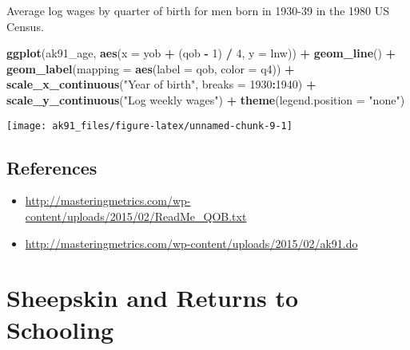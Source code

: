 \documentclass[]{book}
\newenvironment{Shaded}{\begin{snugshade}}{\end{snugshade}}
\newcommand{\KeywordTok}[1]{\textcolor[rgb]{0.13,0.29,0.53}{\textbf{#1}}}
\newcommand{\DataTypeTok}[1]{\textcolor[rgb]{0.13,0.29,0.53}{#1}}
\newcommand{\DecValTok}[1]{\textcolor[rgb]{0.00,0.00,0.81}{#1}}
\newcommand{\StringTok}[1]{\textcolor[rgb]{0.31,0.60,0.02}{#1}}
\newcommand{\OperatorTok}[1]{\textcolor[rgb]{0.81,0.36,0.00}{\textbf{#1}}}
\newcommand{\NormalTok}[1]{#1}
\providecommand{\tightlist}{%
  \setlength{\itemsep}{0pt}\setlength{\parskip}{0pt}}
\theoremstyle{definition}
\theoremstyle{definition}
\theoremstyle{definition}
\theoremstyle{remark}
\begin{document}
Average log wages by quarter of birth for men born in 1930-39 in the
1980 US Census.

\begin{Shaded}
\begin{Highlighting}[]
\KeywordTok{ggplot}\NormalTok{(ak91_age, }\KeywordTok{aes}\NormalTok{(}\DataTypeTok{x =}\NormalTok{ yob }\OperatorTok{+}\StringTok{ }\NormalTok{(qob }\OperatorTok{-}\StringTok{ }\DecValTok{1}\NormalTok{) }\OperatorTok{/}\StringTok{ }\DecValTok{4}\NormalTok{, }\DataTypeTok{y =}\NormalTok{ lnw)) }\OperatorTok{+}
\StringTok{  }\KeywordTok{geom_line}\NormalTok{() }\OperatorTok{+}
\StringTok{  }\KeywordTok{geom_label}\NormalTok{(}\DataTypeTok{mapping =} \KeywordTok{aes}\NormalTok{(}\DataTypeTok{label =}\NormalTok{ qob, }\DataTypeTok{color =}\NormalTok{ q4)) }\OperatorTok{+}
\StringTok{  }\KeywordTok{scale_x_continuous}\NormalTok{(}\StringTok{"Year of birth"}\NormalTok{, }\DataTypeTok{breaks =} \DecValTok{1930}\OperatorTok{:}\DecValTok{1940}\NormalTok{) }\OperatorTok{+}
\StringTok{  }\KeywordTok{scale_y_continuous}\NormalTok{(}\StringTok{"Log weekly wages"}\NormalTok{) }\OperatorTok{+}
\StringTok{  }\KeywordTok{theme}\NormalTok{(}\DataTypeTok{legend.position =} \StringTok{"none"}\NormalTok{)}
\end{Highlighting}
\end{Shaded}

\begin{center}\texttt{[image: ak91\_files/figure-latex/unnamed-chunk-9-1]} \end{center}

\section*{References}\label{references-8}

\begin{itemize}
\tightlist
\item
  \url{http://masteringmetrics.com/wp-content/uploads/2015/02/ReadMe_QOB.txt}
\item
  \url{http://masteringmetrics.com/wp-content/uploads/2015/02/ak91.do}
\end{itemize}

\chapter{Sheepskin and Returns to
Schooling}\label{sheepskin-and-returns-to-schooling}
\end{document}
